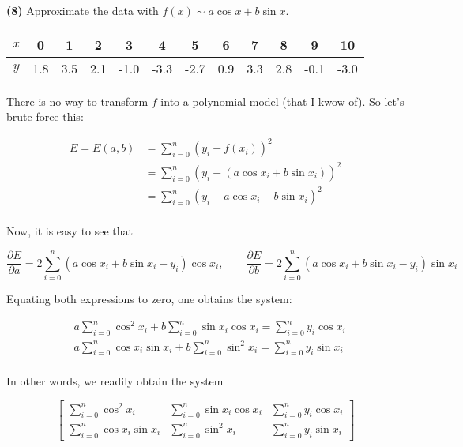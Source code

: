 \documentclass[12pt]{article}
\theoremstyle{definition}
\begin{document}
\pagebreak 

\begin{shaded}
    \textbf{(8)} Approximate the data with $f(x) \sim a \cos x + b \sin x$.


\begin{center}
\begin{tabular}{|c|c c c c c c c c c c c|}
\hline
$x$ & 0 & 1 & 2 & 3 & 4 & 5 & 6 & 7 & 8 & 9 & 10 \\
\hline
$y$ & 1.8 & 3.5 & 2.1 & -1.0 & -3.3 & -2.7 & 0.9 & 3.3 & 2.8 & -0.1 & -3.0 \\
\hline
\end{tabular}
\end{center}
\end{shaded}

There is no way to transform $f$ into a polynomial model (that I kwow of). So
let's brute-force this: 

\begin{align*}
    E = E(a, b) 
    &= \sum_{i=0}^n \left( y_i - f(x_i) \right)^2\\ 
    &=\sum_{i=0}^n \left( y_i - (a \cos x_i + b \sin x_i) \right)^2 \\ &=\sum_{i=0}^n \left( y_i - a \cos x_i - b \sin x_i \right)^2 \\ 
\end{align*}

Now, it is easy to see that 

\begin{equation*}
    \frac{\partial E}{\partial a} = 2 \sum_{i=0}^n(a \cos x_i + b \sin x_i -
    y_i) \cos x_i, \qquad \frac{\partial E}{\partial b} = 2\sum_{i=0}^n(a \cos
    x_i + b \sin x_i - y_i) \sin x_i
\end{equation*}

Equating both expressions to zero, one obtains the system: 

\begin{align*}
    &a \sum_{i=0}^n \cos^2 x_i + b \sum_{i=0}^n \sin x_i \cos x_i = \sum_{i=0}^n
    y_i \cos x_i \\ 
    &a \sum_{i=0}^n \cos x_i \sin x_i+ b \sum_{i=0}^n \sin^2 x_i = \sum_{i=0}^n
    y_i \sin x_i \\ 
\end{align*}

In other words, we readily obtain the system 

\begin{equation*}
    \begin{bmatrix} 
        \sum_{i=0}^n \cos^2 x_i & \sum_{i=0}^n \sin x_i \cos x_i & \sum_{i=0}^n
        y_i \cos x_i\\
        \sum_{i=0}^n \cos x_i \sin x_i & \sum_{i=0}^n \sin^2 x_i & \sum_{i=0}^n
        y_i \sin x_i
    \end{bmatrix} 
\end{equation*}
\end{document}
